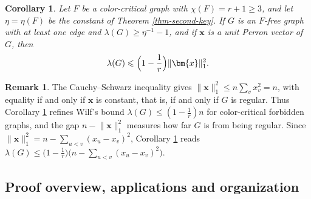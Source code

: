\documentclass[11pt, a4paper]{article}
\newtheorem{corollary}[theorem]{Corollary}
\theoremstyle{definition}
\newtheorem{remark}{Remark}
\theoremstyle{plain}
\renewcommand{\le}{\leqslant}
\renewcommand{\ge}{\geqslant}
\begin{document}
\begin{corollary}\label{cor:perron-wilf}
Let $F$ be a color-critical graph with $\chi (F)=r+1\ge 3$, and let
$\eta =\eta (F)$ be the constant of Theorem \ref{thm-second-key}. If $G$ is an
$F$-free graph with at least one edge and $\lambda (G)\ge \eta^{-1}-1$, and if
$\bm{x}$ is a unit Perron vector of $G$, then
\begin{equation*}
  \lambda (G)\le \Bigl(1-\frac1r\Bigr)\lVert \bm{x}\rVert_1^{2}. 
\end{equation*}
\end{corollary}

\begin{remark}
The Cauchy--Schwarz inequality gives
$\lVert \bm{x}\rVert_1^{2}\le n\sum_v x_v^{2}=n$, with
equality if and only if $\bm{x}$ is constant, that is, if
and only if $G$ is regular. Thus Corollary
\ref{cor:perron-wilf} refines Wilf's bound
$\lambda (G)\le (1-\frac1r)n$ for color-critical forbidden
graphs, and the gap $n-\lVert \bm{x}\rVert_1^{2}$ measures
how far $G$ is from being regular. Since
$\lVert \bm{x}\rVert_1^{2}=n-\sum_{u<v}(x_u-x_v)^{2}$,
Corollary \ref{cor:perron-wilf} reads
$\lambda (G)\le \bigl(1-\frac1r\bigr)
 \bigl(n-\sum_{u<v}(x_u-x_v)^{2}\bigr)$.
\end{remark}



\subsection{Proof overview, applications and organization}
\end{document}
